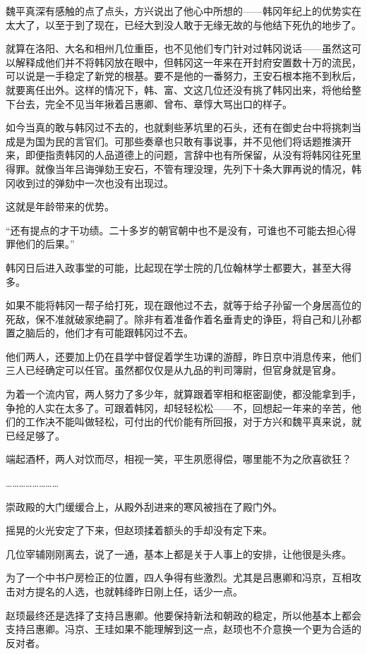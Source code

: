 魏平真深有感触的点了点头，方兴说出了他心中所想的——韩冈年纪上的优势实在太大了，以至于到了现在，已经大到没人敢于无缘无故的与他结下死仇的地步了。

就算在洛阳、大名和相州几位重臣，也不见他们专门针对过韩冈说话——虽然这可以解释成他们并不将韩冈放在眼中，但韩冈这一年来在开封府安置数十万的流民，可以说是一手稳定了新党的根基。要不是他的一番努力，王安石根本拖不到秋后，就要离任出外。这样的情况下，韩、富、文这几位还没有挑了韩冈出来，将他给整下台去，完全不见当年揪着吕惠卿、曾布、章惇大骂出口的样子。

如今当真的敢与韩冈过不去的，也就剩些茅坑里的石头，还有在御史台中将挑刺当成是为国为民的言官们。可那些奏章也只敢有事说事，并不见他们将话题推演开来，即便指责韩冈的人品道德上的问题，言辞中也有所保留，从没有将韩冈往死里得罪。就像当年吕诲弹劾王安石，不管有理没理，先列下十条大罪再说的情况，韩冈收到过的弹劾中一次也没有出现过。

这就是年龄带来的优势。

“还有提点的才干功绩。二十多岁的朝官朝中也不是没有，可谁也不可能去担心得罪他们的后果。”

韩冈日后进入政事堂的可能，比起现在学士院的几位翰林学士都要大，甚至大得多。

如果不能将韩冈一帮子给打死，现在跟他过不去，就等于给子孙留一个身居高位的死敌，保不准就破家绝嗣了。除非有着准备作着名垂青史的诤臣，将自己和儿孙都置之脑后的，他们才有可能跟韩冈过不去。

他们两人，还要加上仍在县学中督促着学生功课的游醇，昨日京中消息传来，他们三人已经确定可以任官。虽然都仅仅是从九品的判司簿尉，但官身就是官身。

为着一个流内官，两人努力了多少年，就算跟着宰相和枢密副使，都没能拿到手，争抢的人实在太多了。可跟着韩冈，却轻轻松松——不，回想起一年来的辛苦，他们的工作决不能叫做轻松，可付出的代价能有所回报，对于方兴和魏平真来说，就已经足够了。

端起酒杯，两人对饮而尽，相视一笑，平生夙愿得偿，哪里能不为之欣喜欲狂？

……………………

崇政殿的大门缓缓合上，从殿外刮进来的寒风被挡在了殿门外。

摇晃的火光安定了下来，但赵顼揉着额头的手却没有定下来。

几位宰辅刚刚离去，说了一通，基本上都是关于人事上的安排，让他很是头疼。

为了一个中书户房检正的位置，四人争得有些激烈。尤其是吕惠卿和冯京，互相攻击对方提名的人选，也就韩绛昨日刚上任，话少一点。

赵顼最终还是选择了支持吕惠卿。他要保持新法和朝政的稳定，所以他基本上都会支持吕惠卿。冯京、王珪如果不能理解到这一点，赵顼也不介意换一个更为合适的反对者。

